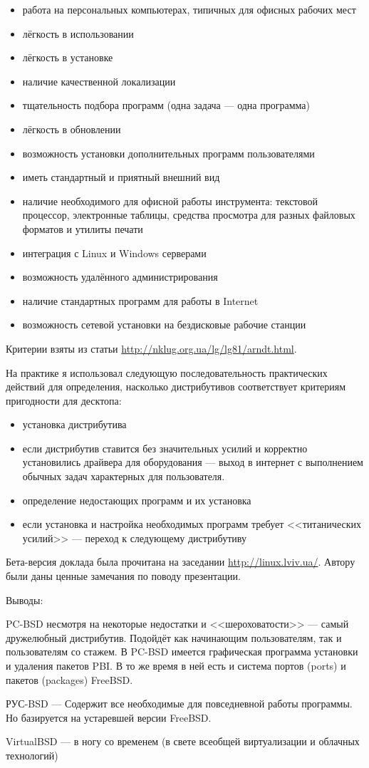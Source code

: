 \documentclass[10pt, a5paper]{article}
\begin{document}
\begin{itemize}
  \item работа на персональных компьютерах, типичных для офисных рабочих
         мест
  \item лёгкость в использовании
  \item лёгкость в установке
  \item наличие качественной локализации
  \item тщательность подбора программ (одна задача --- одна программа)
  \item лёгкость в обновлении
  \item возможность установки дополнительных программ пользователями
  \item иметь стандартный и приятный внешний вид
  \item наличие необходимого для офисной работы инструмента: текстовой процессор, электронные таблицы, средства просмотра для разных файловых форматов и утилиты печати
  \item интеграция с Linux и Windows серверами
  \item возможность удалённого администрирования
  \item наличие стандартных программ для работы в Internet
  \item возможность сетевой установки на бездисковые рабочие станции
\end{itemize}

Критерии взяты из статьи \url{http://nklug.org.ua/lg/lg81/arndt.html}.

На практике я использовал следующую последовательность практических действий для определения,
насколько дистрибутивов соответствует критериям пригодности для десктопа:

\begin{itemize}
  \item установка дистрибутива
  \item если дистрибутив ставится без значительных усилий и корректно установились драйвера для оборудования --- выход в интернет с выполнением обычных задач характерных для пользователя.
  \item определение недостающих программ и их установка
  \item если установка и настройка необходимых программ требует <<титанических усилий>> --- переход к следующему дистрибутиву
\end{itemize}

Бета-версия доклада была прочитана на заседании \url{http://linux.lviv.ua/}. Автору  были даны ценные замечания по поводу презентации.

Выводы:

PC-BSD несмотря на некоторые недостатки и <<шероховатости>> --- самый дружелюбный дистрибутив. Подойдёт как начинающим пользователям, так и пользователям со стажем. 
В PC-BSD имеется графическая программа установки и удаления пакетов PBI. В то же время в ней есть и система портов (ports) и пакетов (packages) FreeBSD.

РУС-BSD --- Содержит все необходимые для повседневной работы программы. Но базируется на устаревшей версии FreeBSD.

VirtualBSD --- в ногу со временем (в свете всеобщей виртуализации и облачных технологий)
\end{document}
